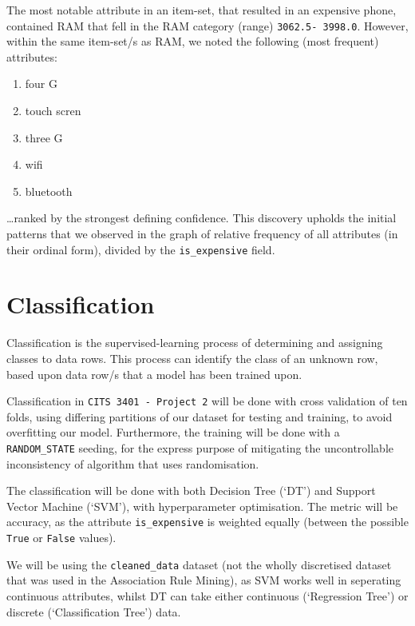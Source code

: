 \documentclass[11pt]{article}
\providecommand{\tightlist}{%
      \setlength{\itemsep}{0pt}\setlength{\parskip}{0pt}}
\begin{document}
The most notable attribute in an item-set, that resulted in an expensive
phone, contained RAM that fell in the RAM category (range)
\texttt{3062.5-\ 3998.0}. However, within the same item-set/s as RAM, we
noted the following (most frequent) attributes:

\begin{enumerate}
\def\labelenumi{\arabic{enumi}.}
\tightlist
\item
  four G
\item
  touch scren
\item
  three G
\item
  wifi
\item
  bluetooth
\end{enumerate}

\ldots ranked by the strongest defining confidence. This discovery
upholds the initial patterns that we observed in the graph of relative
frequency of all attributes (in their ordinal form), divided by the
\texttt{is\_expensive} field.

    \hypertarget{classification}{%
\section{Classification}\label{classification}}

Classification is the supervised-learning process of determining and
assigning classes to data rows. This process can identify the class of
an unknown row, based upon data row/s that a model has been trained
upon.

Classification in \texttt{CITS\ 3401\ -\ Project\ 2} will be done with
cross validation of ten folds, using differing partitions of our dataset
for testing and training, to avoid overfitting our model. Furthermore,
the training will be done with a \texttt{RANDOM\_STATE} seeding, for the
express purpose of mitigating the uncontrollable inconsistency of
algorithm that uses randomisation.

The classification will be done with both Decision Tree (`DT') and
Support Vector Machine (`SVM'), with hyperparameter optimisation. The
metric will be accuracy, as the attribute \texttt{is\_expensive} is
weighted equally (between the possible \texttt{True} or \texttt{False}
values).

We will be using the \texttt{cleaned\_data} dataset (not the wholly
discretised dataset that was used in the Association Rule Mining), as
SVM works well in seperating continuous attributes, whilst DT can take
either continuous (`Regression Tree') or discrete (`Classification
Tree') data.
\end{document}

